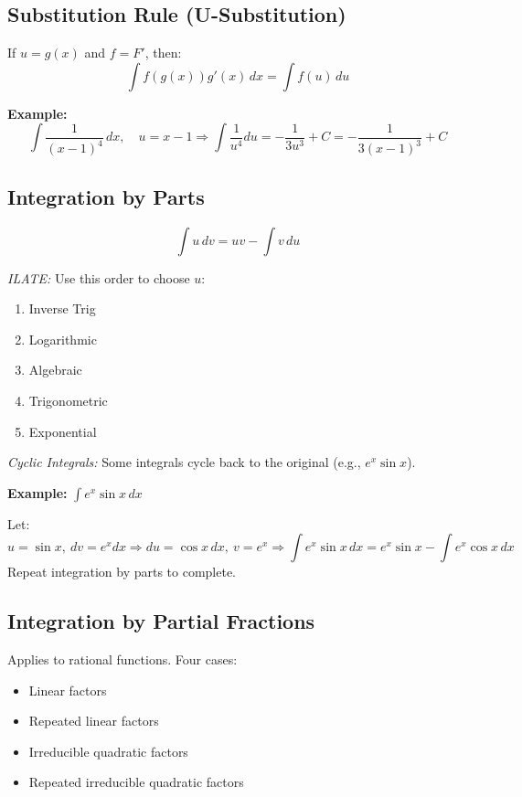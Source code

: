 \subsection{Substitution Rule (U-Substitution)}

If \(u = g(x)\) and \(f = F'\), then:
\[
\int f(g(x))g'(x)\,dx = \int f(u)\,du
\]

\textbf{Example:}
\[
\int \frac{1}{(x - 1)^4}\,dx, \quad u = x - 1 \Rightarrow \int \frac{1}{u^4} du = -\frac{1}{3u^3} + C = -\frac{1}{3(x - 1)^3} + C
\]

\subsection{Integration by Parts}

\[
\int u\,dv = uv - \int v\,du
\]

\emph{ILATE:} Use this order to choose \(u\):
\begin{enumerate}
    \item Inverse Trig
    \item Logarithmic
    \item Algebraic
    \item Trigonometric
    \item Exponential
\end{enumerate}

\emph{Cyclic Integrals:} Some integrals cycle back to the original (e.g., \(e^x \sin x\)).

\textbf{Example:} \(\int e^x \sin x\,dx\)

Let:
\[
u = \sin x,\ dv = e^x dx \Rightarrow du = \cos x\,dx,\ v = e^x
\Rightarrow \int e^x \sin x\,dx = e^x \sin x - \int e^x \cos x\,dx
\]
Repeat integration by parts to complete.

\subsection{Integration by Partial Fractions}

Applies to rational functions. Four cases:

\begin{itemize}[label=\(-\)]
\item Linear factors
\item Repeated linear factors
\item Irreducible quadratic factors
\item Repeated irreducible quadratic factors
\end{itemize}

